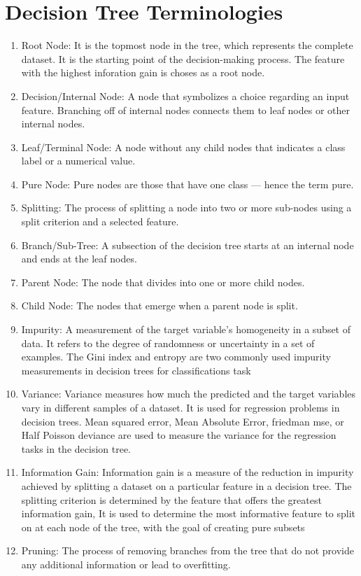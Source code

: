 \section{Decision Tree Terminologies}
    \begin{enumerate}
        \item Root Node: It is the topmost node in the tree,  which represents the complete dataset. It is the starting point of the decision-making process. The feature with the highest inforation gain is choses as a root node.
        \item Decision/Internal Node: A node that symbolizes a choice regarding an input feature. Branching off of internal nodes connects them to leaf nodes or other internal nodes.
        \item Leaf/Terminal Node: A node without any child nodes that indicates a class label or a numerical value.
        \item Pure Node: Pure nodes are those that have one class — hence the term pure.
        \item Splitting: The process of splitting a node into two or more sub-nodes using a split criterion and a selected feature.
        \item Branch/Sub-Tree: A subsection of the decision tree starts at an internal node and ends at the leaf nodes.
        \item Parent Node: The node that divides into one or more child nodes.
        \item Child Node: The nodes that emerge when a parent node is split.
        \item Impurity: A measurement of the target variable's homogeneity in a subset of data. It refers to the degree of randomness or uncertainty in a set of examples. The Gini index and entropy are two commonly used impurity measurements in decision trees for classifications task 
        \item Variance: Variance measures how much the predicted and the target variables vary in different samples of a dataset. It is used for regression problems in decision trees. Mean squared error, Mean Absolute Error, friedman mse, or Half Poisson deviance are used to measure the variance for the regression tasks in the decision tree.        
        \item Information Gain: Information gain is a measure of the reduction in impurity achieved by splitting a dataset on a particular feature in a decision tree. The splitting criterion is determined by the feature that offers the greatest information gain, It is used to determine the most informative feature to split on at each node of the tree, with the goal of creating pure subsets
        \item Pruning: The process of removing branches from the tree that do not provide any additional information or lead to overfitting.
    \end{enumerate}